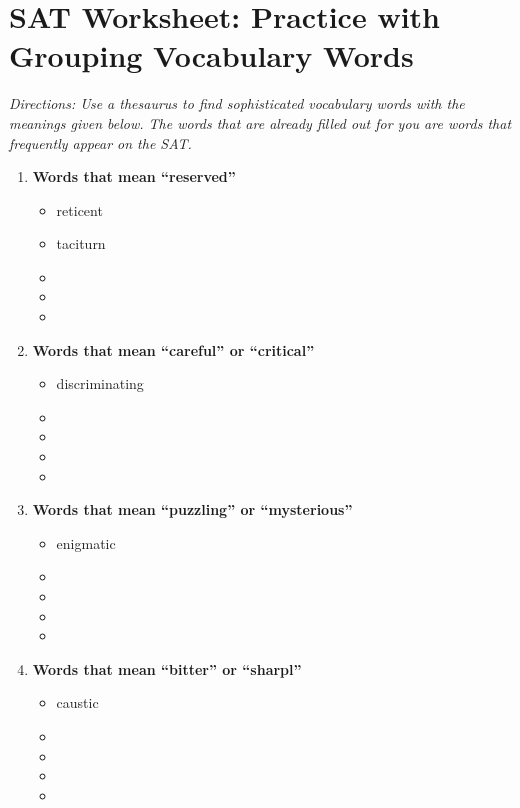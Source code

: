 \section{SAT Worksheet: Practice with Grouping Vocabulary Words}

\textit{Directions: Use a thesaurus to find sophisticated vocabulary words with the meanings given below. The words that are already filled out for you are words that frequently appear on the SAT.}

\begin{enumerate}

\item \textbf{Words that mean ``reserved''}

\begin{itemize}
\item  reticent
\item  taciturn
\item   
\item   
\item  

\end{itemize}


\item \textbf{Words that mean ``careful'' or ``critical''}

\begin{itemize}
\item discriminating   
\item    
\item   
\item   
\item  

\end{itemize}

\item \textbf{Words that mean ``puzzling'' or ``mysterious''}

\begin{itemize}
\item enigmatic
\item    
\item   
\item   
\item  

\end{itemize}

\item \textbf{Words that mean ``bitter'' or ``sharpl''}

\begin{itemize}
\item caustic     
\item    
\item   
\item   
\item  


\end{itemize}
\end{enumerate}
